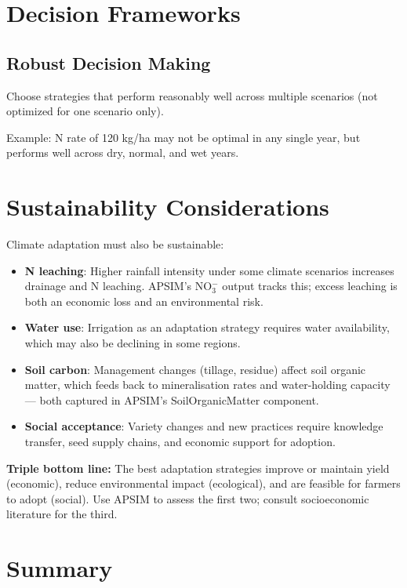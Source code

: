 \section{Decision Frameworks}

\subsection{Robust Decision Making}

Choose strategies that perform reasonably well across multiple scenarios (not optimized for one scenario only).

Example: N rate of 120 kg/ha may not be optimal in any single year, but performs well across dry, normal, and wet years.

\section{Sustainability Considerations}

Climate adaptation must also be sustainable:

\begin{itemize}
  \item \textbf{N leaching}: Higher rainfall intensity under some climate scenarios increases drainage and N leaching. APSIM's NO$_3^-$ output tracks this; excess leaching is both an economic loss and an environmental risk.
  \item \textbf{Water use}: Irrigation as an adaptation strategy requires water availability, which may also be declining in some regions.
  \item \textbf{Soil carbon}: Management changes (tillage, residue) affect soil organic matter, which feeds back to mineralisation rates and water-holding capacity --- both captured in APSIM's SoilOrganicMatter component.
  \item \textbf{Social acceptance}: Variety changes and new practices require knowledge transfer, seed supply chains, and economic support for adoption.
\end{itemize}

\begin{tipbox}
\textbf{Triple bottom line:} The best adaptation strategies improve or maintain yield (economic), reduce environmental impact (ecological), and are feasible for farmers to adopt (social). Use APSIM to assess the first two; consult socioeconomic literature for the third.
\end{tipbox}

\section{Summary}

